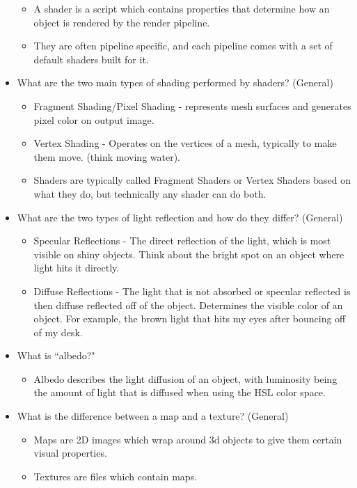 \documentclass{article}
\begin{document}
\begin{itemize}
\begin{itemize}
        \item A shader is a script which contains properties that determine how an object is rendered by the render pipeline.
        \item They are often pipeline specific, and each pipeline comes with a set of default shaders built for it.
    \end{itemize}
    \item What are the two main types of shading performed by shaders? (General)
    \begin{itemize}
        \item Fragment Shading/Pixel Shading - represents mesh surfaces and generates pixel color on output image.
        \item Vertex Shading - Operates on the vertices of a mesh, typically to make them move. (think moving water).
        \item Shaders are typically called Fragment Shaders or Vertex Shaders based on what they do, but technically any shader can do both.
    \end{itemize}
    \item What are the two types of light reflection and how do they differ? (General)
    \begin{itemize}
        \item Specular Reflections - The direct reflection of the light, which is most visible on shiny objects. Think about the bright spot on an object where light hits it directly.
        \item Diffuse Reflections - The light that is not absorbed or specular reflected is then diffuse reflected off of the object. Determines the visible color of an object. For example, the brown light that hits my eyes after bouncing off of my desk.
    \end{itemize}
    \item What is ``albedo?"
    \begin{itemize}
        \item Albedo describes the light diffusion of an object, with luminosity being the amount of light that is diffused when using the HSL color space.
    \end{itemize}
    \item What is the difference between a map and a texture? (General)
    \begin{itemize}
        \item Maps are 2D images which wrap around 3d objects to give them certain visual properties.
        \item Textures are files which contain maps.

\end{itemize}
\end{itemize}
\end{document}
